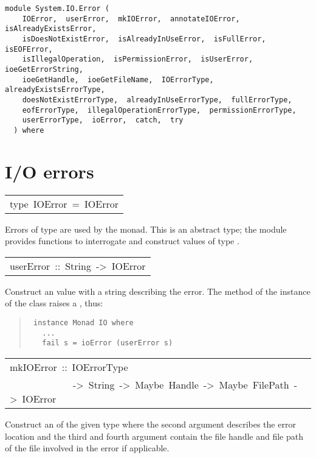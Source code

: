 \label{module:System.IO.Error}
\haddockbeginheader
{\haddockverb\begin{verbatim}
module System.IO.Error (
    IOError,  userError,  mkIOError,  annotateIOError,  isAlreadyExistsError, 
    isDoesNotExistError,  isAlreadyInUseError,  isFullError,  isEOFError, 
    isIllegalOperation,  isPermissionError,  isUserError,  ioeGetErrorString, 
    ioeGetHandle,  ioeGetFileName,  IOErrorType,  alreadyExistsErrorType, 
    doesNotExistErrorType,  alreadyInUseErrorType,  fullErrorType, 
    eofErrorType,  illegalOperationErrorType,  permissionErrorType, 
    userErrorType,  ioError,  catch,  try
  ) where\end{verbatim}}
\haddockendheader

\section{I/O errors
}
\begin{haddockdesc}
\item[\begin{tabular}{@{}l}
type\ IOError\ =\ IOError
\end{tabular}]\haddockbegindoc
Errors of type  are used by the  monad.  This is an
 abstract type; the module  provides functions to
 interrogate and construct values of type .
\par

\end{haddockdesc}
\begin{haddockdesc}
\item[\begin{tabular}{@{}l}
userError\ ::\ String\ ->\ IOError
\end{tabular}]\haddockbegindoc
Construct an  value with a string describing the error.
 The  method of the  instance of the  class raises a
 , thus:
\par
\begin{quote}
{\haddockverb\begin{verbatim}
 instance Monad IO where 
   ...
   fail s = ioError (userError s)
\end{verbatim}}
\end{quote}

\end{haddockdesc}
\begin{haddockdesc}
\item[\begin{tabular}{@{}l}
mkIOError\ ::\ IOErrorType\\\ \ \ \ \ \ \ \ \ \ \ \ \ ->\ String\ ->\ Maybe\ Handle\ ->\ Maybe\ FilePath\ ->\ IOError
\end{tabular}]\haddockbegindoc
Construct an  of the given type where the second argument
 describes the error location and the third and fourth argument
 contain the file handle and file path of the file involved in the
 error if applicable.
\par

\end{haddockdesc}
